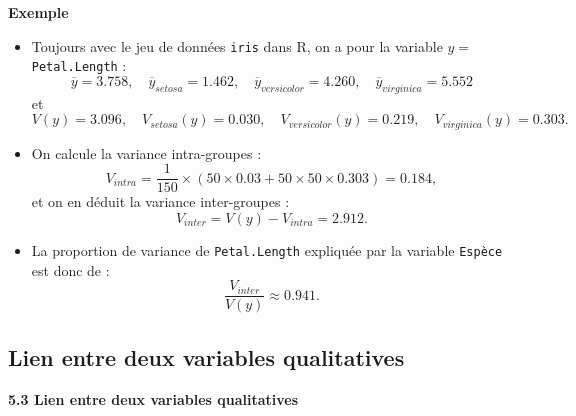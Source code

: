 \documentclass[aspectratio=169,xcolor=dvipsnames]{beamer}
\begin{document}
\begin{frame}
	\begin{exampleblock}{\textbf{Exemple}}
		\begin{footnotesize}
		\begin{itemize}
		\item Toujours avec le jeu de données \texttt{iris} dans \textsf{R}, on a pour la variable $y=$ \texttt{Petal.Length} :
			\[
			\overline{y} = 3.758, \quad \overline{y}_{setosa} = 1.462, \quad \overline{y}_{versicolor}=4.260, \quad \overline{y}_{virginica} = 5.552
			\]
			et
			\[
			V(y) = 3.096, \quad V_{setosa}(y) = 0.030, \quad V_{versicolor}(y)=0.219, \quad V_{virginica}(y) = 0.303.
			\]
		\item On calcule la variance intra-groupes :
			\[
			V_{intra} = \dfrac{1}{150} \times \left( 50 \times 0.03 + 50 \times 50\times 0.303 \right) = 0.184,
			\]
		et on en déduit la variance inter-groupes :
			\[
			V_{inter} = V(y) - V_{intra} = 2.912.
			\]
		\item La proportion de variance de \texttt{Petal.Length} expliquée par la variable \texttt{Espèce} est donc de :
			\[
			\dfrac{V_{inter}}{V(y)} \approx 0.941.
			\]
		\end{itemize}
		\end{footnotesize}
	\end{exampleblock}
\end{frame}

\subsection{Lien entre deux variables qualitatives}

\begin{frame}[plain]

\vfill

\begin{center}
{\huge \textcolor{nyubluedark}{\textbf{5.3 Lien entre deux variables qualitatives}}}
\end{center}

\vfill

\end{frame}
\end{document}
